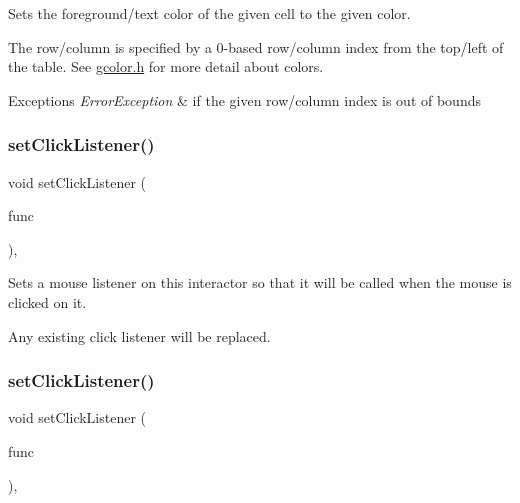 Sets the foreground/text color of the given cell to the given color. 

The row/column is specified by a 0-\/based row/column index from the top/left of the table. See \mbox{\hyperlink{gcolor_8h_source}{gcolor.\+h}} for more detail about colors. 
\begin{DoxyExceptions}{Exceptions}
{\em Error\+Exception} & if the given row/column index is out of bounds \\
\hline
\end{DoxyExceptions}
\mbox{\label{classGInteractor_abd40af6921242584d0954f173911b190}} 
\subsubsection{\texorpdfstring{set\+Click\+Listener()}{setClickListener()}\hspace{0.1cm}{\footnotesize\ttfamily [1/2]}}
{\footnotesize\ttfamily void set\+Click\+Listener (\begin{DoxyParamCaption}\item[{G\+Event\+Listener}]{func }\end{DoxyParamCaption})\hspace{0.3cm}{\ttfamily [virtual]}, {\ttfamily [inherited]}}



Sets a mouse listener on this interactor so that it will be called when the mouse is clicked on it. 

Any existing click listener will be replaced. \mbox{\label{classGInteractor_a856414c92df90f56f3877475eb3f8fc4}} 
\subsubsection{\texorpdfstring{set\+Click\+Listener()}{setClickListener()}\hspace{0.1cm}{\footnotesize\ttfamily [2/2]}}
{\footnotesize\ttfamily void set\+Click\+Listener (\begin{DoxyParamCaption}\item[{G\+Event\+Listener\+Void}]{func }\end{DoxyParamCaption})\hspace{0.3cm}{\ttfamily [virtual]}, {\ttfamily [inherited]}}



